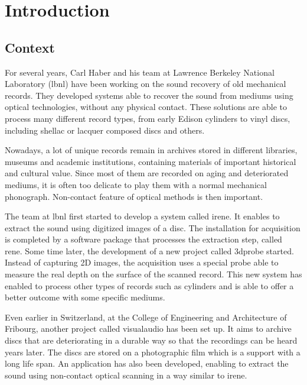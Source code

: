 %

\newcommand{\Csh}{C$^\sharp$}


\chapter{Introduction}

\section{Context}

For several years, Carl Haber and his team at Lawrence Berkeley National Laboratory (\gls{lbnl}) have been working on the sound recovery of old mechanical records. They developed systems able to recover the sound from mediums using optical technologies, without any physical contact. These solutions are able to process many different record types, from early Edison cylinders to vinyl discs, including shellac or lacquer composed discs and others.

Nowadays, a lot of unique records remain in archives stored in different libraries, museums and academic institutions, containing materials of important historical and cultural value. Since most of them are recorded on aging and deteriorated mediums, it is often too delicate to play them with a normal mechanical phonograph. Non-contact feature of optical methods is then important.

The team at \gls{lbnl} first started to develop a system called \gls{irene}. It enables to extract the sound using digitized images of a disc. The installation for acquisition is completed by a software package that processes the extraction step, called \gls{rene}. Some time later, the development of a new project called \gls{3dprobe} started. Instead of capturing 2D images, the acquisition uses a special probe able to measure the real depth on the surface of the scanned record. This new system has enabled to process other types of records such as cylinders and is able to offer a better outcome with some specific mediums.

Even earlier in Switzerland, at the College of Engineering and Architecture of Fribourg, another project called \gls{visualaudio} has been set up. It aims to archive discs that are deteriorating in a durable way so that the recordings can be heard years later. The discs are stored on a photographic film which is a support with a long life span. An application has also been developed, enabling to extract the sound using non-contact optical scanning in a way similar to \gls{irene}.

